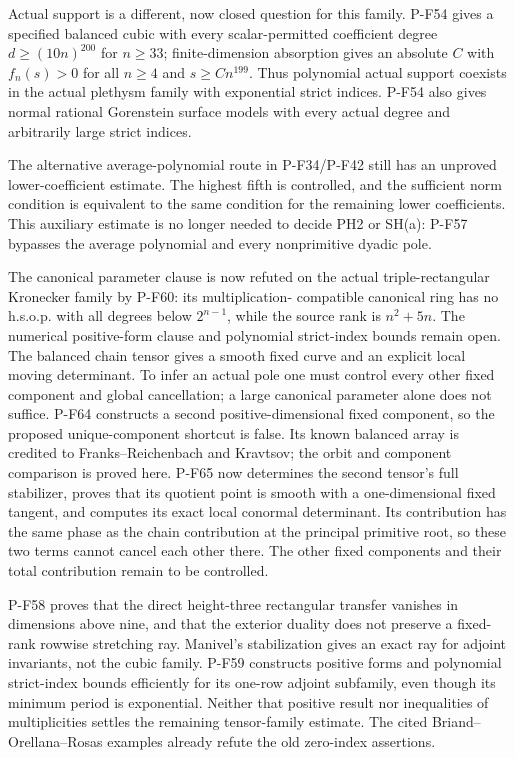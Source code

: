\begin{description}
Actual support is a different, now closed question for this
family. P-F54 gives a specified balanced cubic with every
scalar-permitted coefficient degree $d\ge(10n)^{200}$ for
$n\ge33$; finite-dimension absorption gives an absolute $C$
with $f_n(s)>0$ for all $n\ge4$ and $s\ge Cn^{199}$.
Thus polynomial actual support coexists in the actual
plethysm family with exponential strict indices.
P-F54 also gives normal rational Gorenstein surface models
with every actual degree and arbitrarily large strict indices.

The alternative average-polynomial route in P-F34/P-F42
still has an unproved lower-coefficient estimate. The
highest fifth is controlled, and the sufficient norm
condition is equivalent to the same condition for the
remaining lower coefficients. This auxiliary estimate is
no longer needed to decide PH2 or SH(a): P-F57 bypasses
the average polynomial and every nonprimitive dyadic pole.

\item[O-KRONECKER: numerical positive forms and strict indices.]
The canonical parameter clause is now refuted on the actual
triple-rectangular Kronecker family by P-F60: its multiplication-
compatible canonical ring has no h.s.o.p. with all degrees below
$2^{n-1}$, while the source rank is $n^2+5n$.
The numerical positive-form clause and polynomial strict-index
bounds remain open.  The balanced chain tensor gives a smooth
fixed curve and an explicit local moving determinant.  To infer
an actual pole one must control every other fixed component
and global cancellation; a large canonical parameter alone
does not suffice. P-F64 constructs a second positive-dimensional
fixed component, so the proposed unique-component shortcut is false.
Its known balanced array is credited to Franks--Reichenbach and
Kravtsov; the orbit and component comparison is proved here.
P-F65 now determines the second tensor's full stabilizer, proves
that its quotient point is smooth with a one-dimensional fixed
tangent, and computes its exact local conormal determinant.
Its contribution has the same phase as the chain contribution at
the principal primitive root, so these two terms cannot cancel
each other there.  The other fixed components and their total
contribution remain to be controlled.

P-F58 proves that the direct height-three rectangular transfer
vanishes in dimensions above nine, and that the exterior duality
does not preserve a fixed-rank rowwise stretching ray.
Manivel's stabilization gives an exact ray for adjoint invariants,
not the cubic family.  P-F59 constructs positive forms and
polynomial strict-index bounds efficiently for its one-row
adjoint subfamily, even though its minimum period is exponential.
Neither that positive result nor inequalities of multiplicities
settles the remaining tensor-family estimate.  The cited
Briand--Orellana--Rosas examples already refute the old zero-index
assertions.


\end{description}
